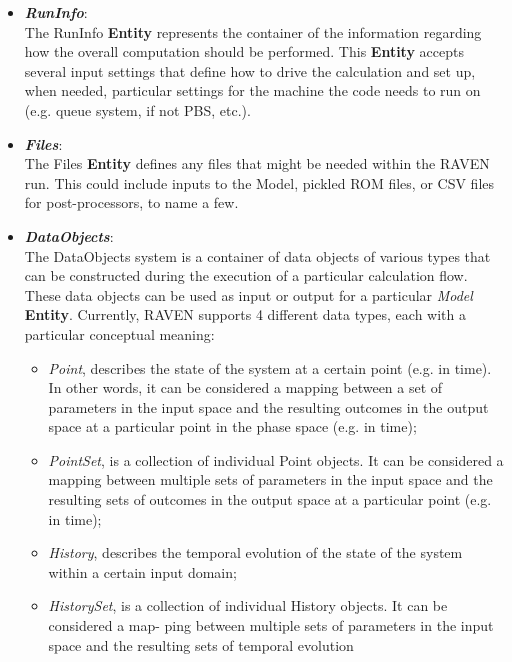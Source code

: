 \begin{itemize}
  \item \textit{\textbf{RunInfo}}: 
    \\The RunInfo \textbf{Entity} represents the container of the information regarding how the overall computation should
      be performed. This \textbf{Entity}  accepts several input settings that define how to drive the calculation and set up, 
      when needed, particular settings for the machine the code needs to run on (e.g. queue system, if not PBS, etc.).  
  \item \textit{\textbf{Files}}: 
  \\ The Files \textbf{Entity}  defines any files that might be needed within the RAVEN run. This could include inputs to the   
      Model, pickled ROM files, or CSV files for post-processors, to name a few.
  \item \textit{\textbf{DataObjects}}: 
    \\The DataObjects system is a container of data objects of various types that can be constructed during the execution of 
     a particular calculation flow. These data objects can be used as input or output for a particular \textit{Model} 
     \textbf{Entity}. Currently, RAVEN supports 4 different data types, each with a particular conceptual meaning:
     \begin{itemize}
        \item \textit{Point}, describes the state of the system at a certain point (e.g. in time). In other words, it can be
                                       considered a mapping between a set of parameters in the input space and the resulting
                                       outcomes in the output space at a particular point in the phase space (e.g. in time);
        \item \textit{PointSet}, is a collection of individual Point objects. It can be considered a mapping between multiple
                                            sets of parameters in the input space and the resulting sets of outcomes in the output space
                                            at a particular point (e.g. in time);
        \item \textit{History},  describes the temporal evolution of the state of the system within a certain input domain;
        \item \textit{HistorySet}, is a collection of individual History objects. It can be considered a map- ping between
                                               multiple sets of parameters in the input space and the resulting sets of temporal evolution

\end{itemize}
\end{itemize}
